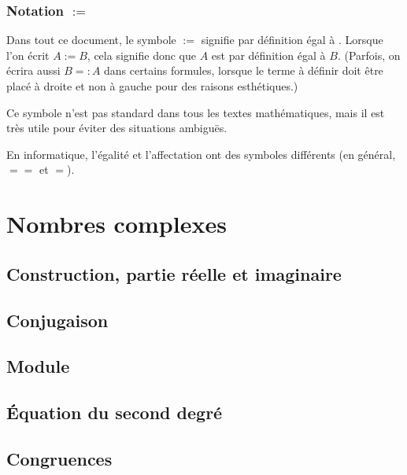 \documentclass[11pt,a4paper,oneside]{book}
\theoremstyle{definition}
\theoremstyle{plain}
\begin{document}
\subsection{Notation \og $:=$\fg}

Dans tout ce document, le symbole \og $:=$\fg{} signifie \og par définition égal à \fg. Lorsque l'on écrit $A:=B$, cela signifie donc que $A$ est par définition égal à $B$. (Parfois, on écrira aussi $B=:A$  dans certains formules, lorsque le terme à définir doit être placé à droite et non à gauche pour des raisons esthétiques.)

Ce symbole n'est pas standard dans tous les textes mathématiques, mais il est très utile pour éviter des situations ambiguës.

\begin{remarque}
En informatique, l'égalité et l'affectation ont des symboles différents (en général, \og$==$\fg{} et \og$=$\fg). 
\end{remarque}

\chapter{Nombres complexes}


\section{Construction, partie réelle et imaginaire}
\label{sec:construction}




\section{Conjugaison}
\label{sec:conjugaison}



\section{Module}
\label{sec:module}


\section{Équation du second degré}
\label{sec:second_degre}


\section{Congruences}
\label{sec:congruences}

\end{document}

